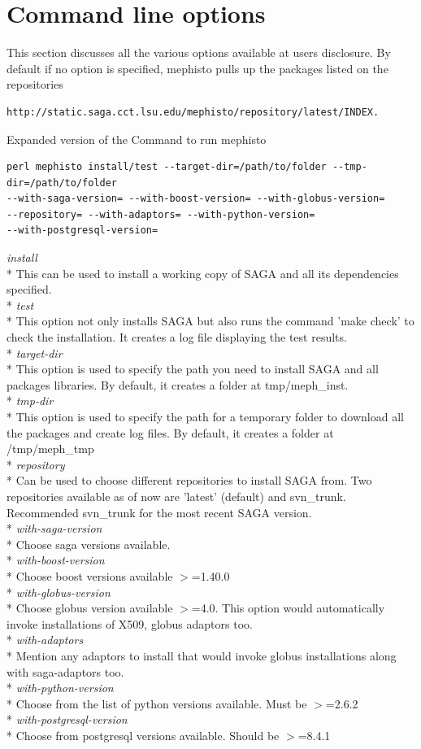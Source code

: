 \documentclass[a4paper,10pt]{article}
\begin{document}
\section*{Command line options}
This section discusses all the various options available at 
users disclosure. By default if no option is specified, mephisto 
pulls up the packages listed on the repositories
\begin{verbatim} 
http://static.saga.cct.lsu.edu/mephisto/repository/latest/INDEX. 
\end{verbatim}
Expanded version of the Command to run mephisto
\begin{verbatim} 
perl mephisto install/test --target-dir=/path/to/folder --tmp-dir=/path/to/folder 
--with-saga-version= --with-boost-version= --with-globus-version= 
--repository= --with-adaptors= --with-python-version= 
--with-postgresql-version=
\end{verbatim} 
\emph{install} \\*
 This can be used to install a working copy of SAGA and all its 
 dependencies specified. \\*
\emph{test} \\*
 This option not only installs SAGA but also runs the command 
 'make check' to check the installation. It creates a log file displaying 
 the test results. \\*
\emph{target-dir} \\*
 This option is used to specify the path you need to install SAGA and all 
 packages libraries. By default, it creates a folder at tmp/meph\_inst.\\*
\emph{tmp-dir} \\*
 This option is used to specify the path for a temporary folder to 
 download all the packages and create log files. By default, it 
 creates a folder at /tmp/meph\_tmp\\*
\emph{repository} \\*
 Can be used to choose different repositories to install SAGA from. 
 Two repositories available as of now are 'latest' (default) and svn\_trunk. 
 Recommended svn\_trunk for the most recent SAGA version. \\*
\emph{with-saga-version}\\*
 Choose saga versions available.\\*
\emph{with-boost-version}\\*
Choose boost versions available $>$=1.40.0\\*
\emph{with-globus-version} \\*
 Choose globus version available $>$=4.0. This option would automatically 
 invoke installations of X509, globus adaptors too. \\*
\emph{with-adaptors}\\*
 Mention any adaptors to install that would invoke globus installations along with 
 saga-adaptors too. \\*
 \emph{with-python-version}\\*
 Choose from the list of python versions available. Must be 
 $>$=2.6.2 \\*
 \emph{with-postgresql-version}\\*
 Choose from postgresql versions available. Should be $>$=8.4.1
\end{document}
